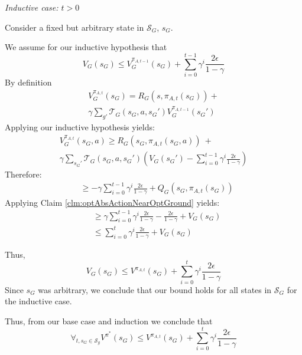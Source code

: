 \textit{Inductive case: $t > 0$}

Consider a fixed but arbitrary state in $\mathcal{S}_G$, $s_G$.

We assume for our inductive hypothesis that
\begin{equation}
V_G(s_G) \leq V_G^{\pi_{A,t-1}}(s_G) + \sum_{i=0}^{t-1}\gamma^i \frac{2\epsilon}{1-\gamma}
\end{equation}
By definition 
\begin{multline*}
V_G^{\pi_{A,t}}(s_G) = R_G(s, \pi_{A,t}(s_G)) + \\ \gamma \sum_{g'}\mathcal{T}_G(s_G, a, {s_G}')V_G^{\pi_{A,t-1}}({s_G}')
\end{multline*}
Applying our inductive hypothesis yields:
\begin{multline*}
V_G^{\pi_{A,t}}(s_G, a) \geq R_G(s_G, \pi_{A,t}(s_G, a))\ + \\ \gamma \sum_{{s_G}'}\mathcal{T}_G(s_G, a, {s_G}')\left(V_G({s_G}') - \sum_{i=0}^{t-1}\gamma^i \frac{2\epsilon}{1-\gamma} \right)
\end{multline*}
Therefore:
\begin{align*}
&\geq -\gamma\sum_{i=0}^{t-1}\gamma^i \frac{2\epsilon}{1-\gamma} + Q_G(s_G, \pi_{A,t} (s_G))
\end{align*}
Applying Claim \ref{clm:optAbsActionNearOptGround} yields:
\begin{align*}
&\geq \gamma\sum_{i=0}^{t-1}\gamma^i \frac{2\epsilon}{1-\gamma} - \frac{2\epsilon}{1-\gamma} + V_{G}(s_G)\\
&\leq \sum_{i=0}^{t}\gamma^i \frac{2\epsilon}{1-\gamma} + V_G(s_G)
\end{align*}

Thus,
\begin{equation*}
V_G(s_G) \leq V^{\pi_{A,t}}(s_G)  + \sum_{i=0}^{t}\gamma^i \frac{2\epsilon}{1-\gamma}
\end{equation*}
Since $s_G$ was arbitrary, we conclude that our bound holds for all states in $\mathcal{S}_G$ for the inductive case.

Thus, from our base case and induction we conclude that
\begin{equation}
\forall_{t, s_G \in \mathcal{S}_g} V^{\pi^*}(s_G) \leq  V^{\pi_{A,t}}(s_G) + \sum_{i=0}^{t}\gamma^i \frac{2\epsilon}{1-\gamma}
\end{equation}

